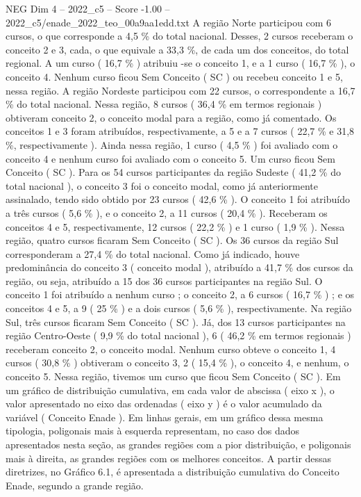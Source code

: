 \begin{textsample}{NEG Dim 4 – 2022\_c5 – Score -1.00 – 2022\_c5/enade\_2022\_teo\_00a9aa1edd.txt}
A região Norte participou com 6 cursos, o que corresponde a 4,5 \% do total nacional.
Desses, 2 cursos receberam o conceito 2 e 3, cada, o que equivale a 33,3 \%, de cada um dos conceitos, do total regional.
A um curso ( 16,7 \% ) atribuiu -se o conceito 1, e a 1 curso ( 16,7 \% ), o conceito 4.
Nenhum curso ficou Sem Conceito ( SC ) ou recebeu conceito 1 e 5, nessa região.
A região Nordeste participou com 22 cursos, o correspondente a 16,7 \% do total nacional.
Nessa região, 8 cursos ( 36,4 \% em termos regionais ) obtiveram conceito 2, o conceito modal para a região, como já comentado.
Os conceitos 1 e 3 foram atribuídos, respectivamente, a 5 e a 7 cursos ( 22,7 \% e 31,8 \%, respectivamente ).
Ainda nessa região, 1 curso ( 4,5 \% ) foi avaliado com o conceito 4 e nenhum curso foi avaliado com o conceito 5.
Um curso ficou Sem Conceito ( SC ).
Para os 54 cursos participantes da região Sudeste ( 41,2 \% do total nacional ), o conceito 3 foi o conceito modal, como já anteriormente assinalado, tendo sido obtido por 23 cursos ( 42,6 \% ).
O conceito 1 foi atribuído a três cursos ( 5,6 \% ), e o conceito 2, a 11 cursos ( 20,4 \% ).
Receberam os conceitos 4 e 5, respectivamente, 12 cursos ( 22,2 \% ) e 1 curso ( 1,9 \% ).
Nessa região, quatro cursos ficaram Sem Conceito ( SC ).
Os 36 cursos da região Sul corresponderam a 27,4 \% do total nacional.
Como já indicado, houve predominância do conceito 3 ( conceito modal ), atribuído a 41,7 \% dos cursos da região, ou seja, atribuído a 15 dos 36 cursos participantes na região Sul.
O conceito 1 foi atribuído a nenhum curso ; o conceito 2, a 6 cursos ( 16,7 \% ) ; e os conceitos 4 e 5, a 9 ( 25 \% ) e a dois cursos ( 5,6 \% ), respectivamente.
Na região Sul, três cursos ficaram Sem Conceito ( SC ).
Já, dos 13 cursos participantes na região Centro-Oeste ( 9,9 \% do total nacional ), 6 ( 46,2 \% em termos regionais ) receberam conceito 2, o conceito modal.
Nenhum curso obteve o conceito 1, 4 cursos ( 30,8 \% ) obtiveram o conceito 3, 2 ( 15,4 \% ), o conceito 4, e nenhum, o conceito 5.
Nessa região, tivemos um curso que ficou Sem Conceito ( SC ).
Em um gráfico de distribuição cumulativa, em cada valor de abscissa ( eixo x ), o valor apresentado no eixo das ordenadas ( eixo y ) é o valor acumulado da variável ( Conceito Enade ).
Em linhas gerais, em um gráfico dessa mesma tipologia, poligonais mais à esquerda representam, no caso dos dados apresentados nesta seção, as grandes regiões com a pior distribuição, e poligonais mais à direita, as grandes regiões com os melhores conceitos.
A partir dessas diretrizes, no Gráfico 6.1, é apresentada a distribuição cumulativa do Conceito Enade, segundo a grande região.

\end{textsample}
